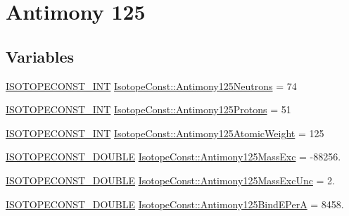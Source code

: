 \hypertarget{group___isotope_const-_antimony-_sb125}{}\section{Antimony 125}
\label{group___isotope_const-_antimony-_sb125}
\subsection*{Variables}
\begin{DoxyCompactItemize}
\item 
\mbox{\hyperlink{group___isotope_const-_macros_ga5f18360b3e99483a35c32d789e62621c}{I\+S\+O\+T\+O\+P\+E\+C\+O\+N\+S\+T\+\_\+\+I\+NT}} \mbox{\hyperlink{group___isotope_const-_antimony-_sb125_gadcf20979992a2ba3b0358252e4300e6a}{Isotope\+Const\+::\+Antimony125\+Neutrons}} = 74
\item 
\mbox{\hyperlink{group___isotope_const-_macros_ga5f18360b3e99483a35c32d789e62621c}{I\+S\+O\+T\+O\+P\+E\+C\+O\+N\+S\+T\+\_\+\+I\+NT}} \mbox{\hyperlink{group___isotope_const-_antimony-_sb125_ga0cdb5958a5c8c33856103b759cc3055d}{Isotope\+Const\+::\+Antimony125\+Protons}} = 51
\item 
\mbox{\hyperlink{group___isotope_const-_macros_ga5f18360b3e99483a35c32d789e62621c}{I\+S\+O\+T\+O\+P\+E\+C\+O\+N\+S\+T\+\_\+\+I\+NT}} \mbox{\hyperlink{group___isotope_const-_antimony-_sb125_ga659078bbe7a7b938b039823c36d02f7c}{Isotope\+Const\+::\+Antimony125\+Atomic\+Weight}} = 125
\item 
\mbox{\hyperlink{group___isotope_const-_macros_ga8f45a7272ce02c0b4c65c44636ed719a}{I\+S\+O\+T\+O\+P\+E\+C\+O\+N\+S\+T\+\_\+\+D\+O\+U\+B\+LE}} \mbox{\hyperlink{group___isotope_const-_antimony-_sb125_ga2a3865c385888be4966d05fc7faa0d68}{Isotope\+Const\+::\+Antimony125\+Mass\+Exc}} = -\/88256.
\item 
\mbox{\hyperlink{group___isotope_const-_macros_ga8f45a7272ce02c0b4c65c44636ed719a}{I\+S\+O\+T\+O\+P\+E\+C\+O\+N\+S\+T\+\_\+\+D\+O\+U\+B\+LE}} \mbox{\hyperlink{group___isotope_const-_antimony-_sb125_gafbd5416f8a58d7f6b88e2828ae94f6d4}{Isotope\+Const\+::\+Antimony125\+Mass\+Exc\+Unc}} = 2.
\item 
\mbox{\hyperlink{group___isotope_const-_macros_ga8f45a7272ce02c0b4c65c44636ed719a}{I\+S\+O\+T\+O\+P\+E\+C\+O\+N\+S\+T\+\_\+\+D\+O\+U\+B\+LE}} \mbox{\hyperlink{group___isotope_const-_antimony-_sb125_gae2e23998a8729a1c986a17b5f6f9a797}{Isotope\+Const\+::\+Antimony125\+Bind\+E\+PerA}} = 8458.
\item 

\end{DoxyCompactItemize}
